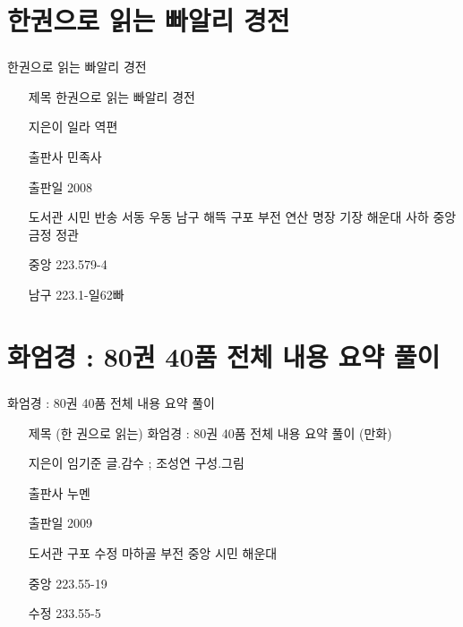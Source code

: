 \documentclass[aspectratio=1610,14pt,xcolor=pdftex,dvipsnames,table,handout]{beamer}
\begin{document}
		\section{ 한권으로 읽는 빠알리 경전 }
		\begin{frame} [t,plain]
		\frametitle{}
			\begin{block} { 한권으로 읽는 빠알리 경전 }
			\setlength{\leftmargini}{4em}			
			\begin{itemize}
				\item [제목]  	한권으로 읽는 빠알리 경전 
				\item [지은이]	일라 역편
				\item [출판사]	민족사
				\item [출판일]	2008

				\item [도서관]		시민 반송 서동 우동 남구 해뜩 구포 부전 연산 명장 기장 해운대 사하 중앙 금정 정관
				\item [중앙]		223.579-4
				\item [남구]		223.1-일62빠
			\end{itemize}
			\end{block}						
		\end{frame}						


		\section{ 화엄경 : 80권 40품 전체 내용 요약 풀이 }
		\begin{frame} [t,plain]
		\frametitle{}
			\begin{block} { 화엄경 : 80권 40품 전체 내용 요약 풀이 }
			\setlength{\leftmargini}{4em}			
			\begin{itemize}
				\item [제목]  	(한 권으로 읽는) 화엄경 : 80권 40품 전체 내용 요약 풀이 (만화) 
				\item [지은이]	임기준 글.감수 ; 조성연 구성.그림
				\item [출판사]	누멘
				\item [출판일]	2009
				\item [도서관]		구포 수정 마하골 부전 중앙 시민 해운대
				\item [중앙]		223.55-19
				\item [수정]		233.55-5
			\end{itemize}
			\end{block}						
		\end{frame}						
\end{document}
